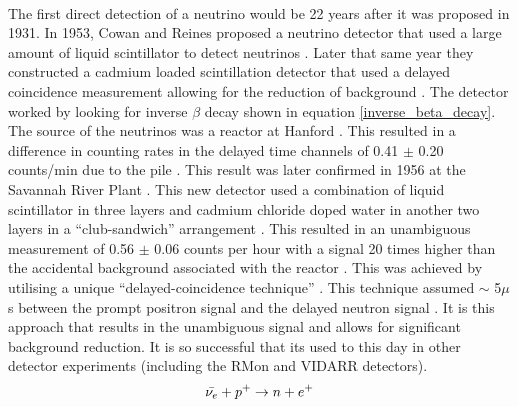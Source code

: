 \\The first direct detection of a neutrino would be 22 years after it was proposed in 1931. In 1953, Cowan and Reines proposed a neutrino detector that used a large amount of liquid scintillator to detect neutrinos \cite{reines1953proposed}. Later that same year they constructed a cadmium loaded scintillation detector that used a delayed coincidence measurement allowing for the reduction of background \cite{reines1953proposed} \cite{reines1953detection}. The detector worked by looking for inverse $\beta$ decay shown in equation \ref{inverse_beta_decay}. The source of the neutrinos was a reactor at Hanford \cite{reines1953detection}. This resulted in a difference in counting rates in the delayed time channels of 0.41 $\pm$ 0.20 counts/min due to the pile \cite{reines1953detection}. This result was later confirmed in 1956 at the Savannah River Plant \cite{Cowan1956Confirmation}. This new detector used a combination of liquid scintillator in three layers and cadmium chloride doped water in another two layers in a ``club-sandwich'' arrangement \cite{Cowan1956Confirmation}. This resulted in an unambiguous measurement of 0.56 $\pm$ 0.06 counts per hour with a signal 20 times higher than the accidental background associated with the reactor \cite{Cowan1956Confirmation}. This was achieved by utilising a unique ``delayed-coincidence technique'' \cite{reines1953detection}. This technique assumed $\sim$ 5$\mu$s between the prompt positron signal and the delayed neutron signal \cite{reines1953detection}. It is this approach that results in the unambiguous signal and allows for significant background reduction. It is so successful that its used to this day in other detector experiments (including the RMon and VIDARR detectors).
\begin{equation}
    \Bar{\nu_e} + p^+ \rightarrow n + e^+
    \label{inverse_beta_decay}
\end{equation}
